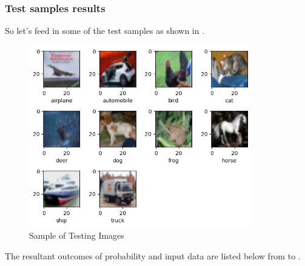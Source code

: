 \documentclass{tron}
\begin{document}
\subsubsection{Test samples results}
So let's feed in some of the test samples as shown in .
\begin{figure}[H]
	\center
	\includegraphics[height=300px]{../src_code/output/p3/sample_imgs.}
	\caption{Sample of Testing Images}
	\label{fig:p3:sample_imgs}
\end{figure}

The resultant outcomes of probability and input data are listed below from  to .
\end{document}
